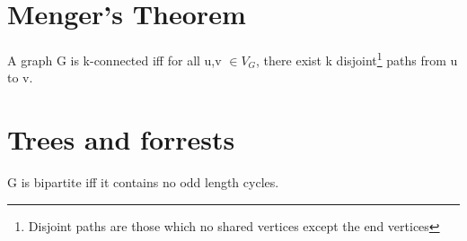 \documentclass{article}
\begin{document}

\section{Menger's Theorem}
\begin{theorem}
    A graph G is k-connected iff for all u,v $\in V_{G}$, there exist k disjoint\footnote{Disjoint paths are those which no shared vertices except the end vertices} paths from u to v.
\end{theorem}

\section{Trees and forrests}
\begin{theorem}
    G is bipartite iff it contains no odd length cycles.
\end{theorem}
\end{document}
